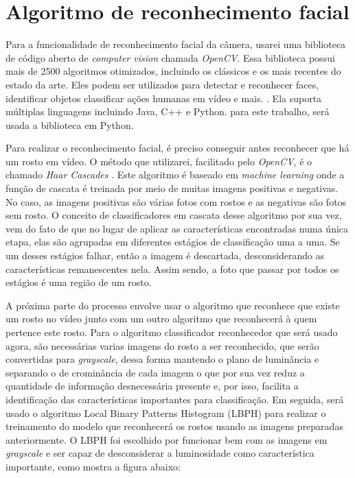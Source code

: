 \documentclass[12pt, %
openright, 
oneside, %
a4paper,    %
brazil]{facom-ufu-abntex2}
\begin{document}
\section{Algoritmo de reconhecimento facial}

Para a funcionalidade de reconhecimento facial da câmera, usarei uma biblioteca de código aberto
de \emph{computer vision} chamada \emph{OpenCV}. Essa biblioteca possui mais de 2500 algoritmos
otimizados, incluindo os clássicos e os mais recentes do estado da arte. Eles podem ser utilizados
para detectar e reconhecer faces, identificar objetos classificar ações humanas em vídeo e mais. \cite{opencv}.
Ela suporta múltiplas linguagens incluindo Java, C++ e Python. para este trabalho, será usada a biblioteca em Python.

Para realizar o reconhecimento facial, é preciso conseguir antes reconhecer que há um rosto em vídeo.
O método que utilizarei, facilitado pelo \emph{OpenCV}, é o chamado \emph{Haar Cascades} \cite{viola2001rapid}.
Este algoritmo é baseado em \emph{machine learning} onde a função de cascata é treinada por meio de muitas imagens positivas
e negativas. No caso, as imagens positivas são várias fotos com rostos e as negativas são fotos sem rosto. O conceito
de classificadores em cascata desse algoritmo por sua vez, vem do fato de que no lugar de aplicar as características
encontradas numa única etapa, elas são agrupadas em diferentes estágios de classificação uma a uma. Se um desses estágios
falhar, então a imagem é descartada, desconsiderando as características remanescentes nela. Assim sendo, a foto que passar
por todos os estágios é uma região de um rosto.

A próxima parte do processo envolve usar o algoritmo que reconhece que existe um rosto no vídeo junto com um outro
algoritmo que reconhecerá à quem pertence este rosto. Para o algoritmo classificador reconhecedor que será usado agora, são necessárias
varias imagens do rosto a ser reconhecido, que serão convertidas para \emph{grayscale}, dessa forma mantendo o plano de luminância
e separando o de crominância de cada imagem o que por sua vez reduz a quantidade de informação desnecessária presente e, por isso, facilita a identificação
das características importantes para classificação. Em seguida, será usado o algoritmo Local Binary Patterns Histogram (LBPH) para
realizar o treinamento do modelo que reconhecerá os rostos usando as imagens preparadas anteriormente. O LBPH foi escolhido
por funcionar bem com as imagens em \emph{grayscale} e ser capaz de desconsiderar a luminosidade como característica importante, como
mostra a figura abaixo:
\end{document}
